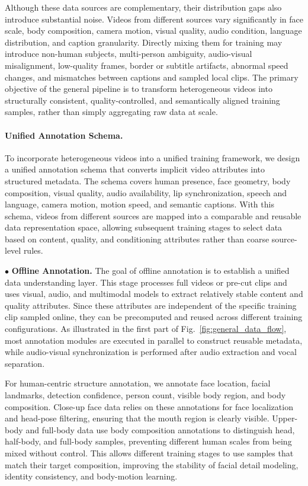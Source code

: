 Although these data sources are complementary, their distribution gaps also introduce substantial noise. Videos from different sources vary significantly in face scale, body composition, camera motion, visual quality, audio condition, language distribution, and caption granularity. Directly mixing them for training may introduce non-human subjects, multi-person ambiguity, audio-visual misalignment, low-quality frames, border or subtitle artifacts, abnormal speed changes, and mismatches between captions and sampled local clips. The primary objective of the general pipeline is to transform heterogeneous videos into structurally consistent, quality-controlled, and semantically aligned training samples, rather than simply aggregating raw data at scale.

\paragraph{Unified Annotation Schema.}
To incorporate heterogeneous videos into a unified training framework, we design a unified annotation schema that converts implicit video attributes into structured metadata. The schema covers human presence, face geometry, body composition, visual quality, audio availability, lip synchronization, speech and language, camera motion, motion speed, and semantic captions. With this schema, videos from different sources are mapped into a comparable and reusable data representation space, allowing subsequent training stages to select data based on content, quality, and conditioning attributes rather than coarse source-level rules.

$\bullet$ \textbf{Offline Annotation.}
The goal of offline annotation is to establish a unified data understanding layer. This stage processes full videos or pre-cut clips and uses visual, audio, and multimodal models to extract relatively stable content and quality attributes. Since these attributes are independent of the specific training clip sampled online, they can be precomputed and reused across different training configurations. As illustrated in the first part of Fig.~\ref{fig:general_data_flow}, most annotation modules are executed in parallel to construct reusable metadata, while audio-visual synchronization is performed after audio extraction and vocal separation.

For human-centric structure annotation, we annotate face location, facial landmarks, detection confidence, person count, visible body region, and body composition. Close-up face data relies on these annotations for face localization and head-pose filtering, ensuring that the mouth region is clearly visible. Upper-body and full-body data use body composition annotations to distinguish head, half-body, and full-body samples, preventing different human scales from being mixed without control. This allows different training stages to use samples that match their target composition, improving the stability of facial detail modeling, identity consistency, and body-motion learning.

